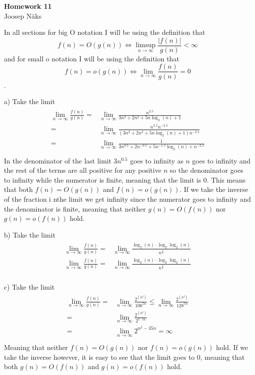 \documentclass[a4paper, 10pt]{article}
\begin{document}
\begin{center}
\Large\textbf{Homework 11}\\
\small{Joosep Näks}
\end{center}

In all sections for big O notation I will be using the definition that $$f(n)=O(g(n))\Leftrightarrow\limsup_{n\to\infty}\frac{|f(n)|}{g(n)}<\infty$$ and for small o notation I will be using the definition that $$f(n)=o(g(n))\Leftrightarrow\lim_{n\to\infty}\frac{f(n)}{g(n)}=0$$.

a) Take the limit 
\begin{gather*}
\begin{aligned}
\lim_{n\to\infty}\frac{f(n)}{g(n)}=&\lim_{n\to\infty}\frac{n^{2.5}}{3n^3+2n^2+5n\log_2(n)+1}\\
=&\lim_{n\to\infty}\frac{n^{2.5}n^{-2.5}}{(3n^3+2n^2+5n\log_2(n)+1)n^{-2.5}}\\
=&\lim_{n\to\infty}\frac{1}{3n^{0.5}+2n^{-0.5}+5n^{-1.5}\log_2(n)+n^{-2.5}}\\
\end{aligned}
\end{gather*}
In the denominator of the last limit $3n^{0.5}$ goes to infinity as $n$ goes to infinity and the rest of the terms are all positive for any positive $n$ so the denominator goes to infinity while the numerator is finite, meaning that the limit is 0. This means that both $f(n)=O(g(n))$ and $f(n)=o(g(n))$. If we take the inverse of the fraction i nthe limit we get infinity since the numerator goes to infinity and the denominator is finite, meaning that neither $g(n)=O(f(n))$ nor $g(n)=o(f(n))$ hold.

b) Take the limit 
\begin{gather*}
\begin{aligned}
\lim_{n\to\infty}\frac{f(n)}{g(n)}=&\lim_{n\to\infty}\frac{\log_2(n)\cdot\log_2\log_2(n)}{n^{\frac13}}\\
\lim_{n\to\infty}\frac{f(n)}{g(n)}=&\lim_{n\to\infty}\frac{\log_2(n)\cdot\log_2\log_2(n)}{n^{\frac13}}\\
\end{aligned}
\end{gather*}

c) Take the limit 
\begin{gather*}
\begin{aligned}
\lim_{n\to\infty}\frac{f(n)}{g(n)}=&\lim_{n\to\infty}\frac{2^{(n^2)}}{100^{5n}}\leq\lim_{n\to\infty}\frac{2^{(n^2)}}{128^{5n}}\\
=&\lim_{n\to\infty}\frac{2^{(n^2)}}{2^{7\cdot5n}}\\
=&\lim_{n\to\infty}2^{n^2-35n}=\infty\\
\end{aligned}
\end{gather*}
Meaning that neither $f(n)=O(g(n))$ nor $f(n)=o(g(n))$ hold. If we take the inverse however, it is easy to see that the limit goes to 0, meaning that both $g(n)=O(f(n))$ and $g(n)=o(f(n))$ hold.
\end{document}
